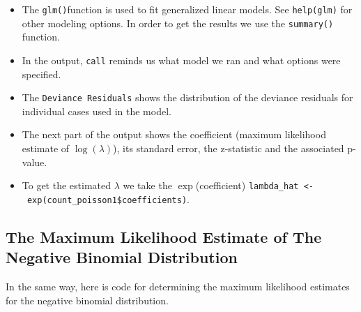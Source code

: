 \documentclass[]{book}
\providecommand{\tightlist}{%
  \setlength{\itemsep}{0pt}\setlength{\parskip}{0pt}}
\theoremstyle{definition}
\theoremstyle{definition}
\theoremstyle{definition}
\theoremstyle{remark}
\begin{document}
\begin{itemize}
\tightlist
\item
  The \texttt{glm()}function is used to fit generalized linear models.
  See \texttt{help(glm)} for other modeling options. In order to get the
  results we use the \texttt{summary()} function.
\item
  In the output, \texttt{call} reminds us what model we ran and what
  options were specified.
\item
  The \texttt{Deviance\ Residuals} shows the distribution of the
  deviance residuals for individual cases used in the model.
\item
  The next part of the output shows the coefficient (maximum likelihood
  estimate of \(\log(\lambda)\)), its standard error, the z-statistic
  and the associated p-value.
\item
  To get the estimated \(\lambda\) we take the \(\exp\)(coefficient)
  \texttt{lambda\_hat\ \textless{}-\ exp(count\_poisson1\$coefficients)}.
\end{itemize}

\subsection{The Maximum Likelihood Estimate of The Negative Binomial
Distribution}\label{the-maximum-likelihood-estimate-of-the-negative-binomial-distribution}

In the same way, here is code for determining the maximum likelihood
estimates for the negative binomial distribution.
\end{document}
